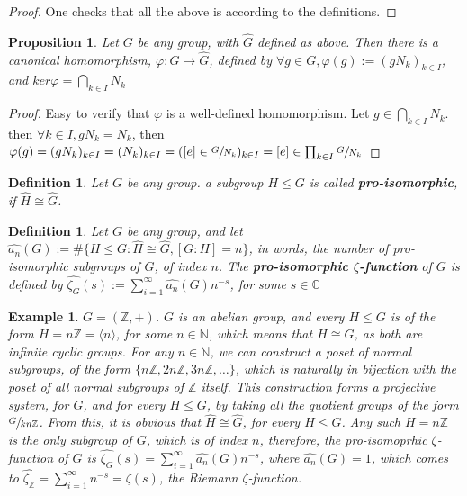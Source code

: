 \documentclass[12pt]{article}
\newtheorem{proposition}[theorem]{Proposition}
\newtheorem{definition}[theorem]{Definition}
\newtheorem{example}[theorem]{Example}
\begin{document}
\begin{proof}
    One checks that all the above is according to the definitions.
\end{proof}
\begin{proposition}
\label{prop:homomorphism.inserve.limit}
Let $G$ be any group, with $\widehat{G}$ defined as above. Then there is a canonical homomorphism, $\varphi:G\rightarrow\widehat{G}$, defined by $\forall g\in G, \varphi(g):=(gN_k)_{k\in I}$, and $ker\varphi=\bigcap_{k\in I}N_k$
\end{proposition}
\begin{proof}
Easy to verify that $\varphi$ is a well-defined homomorphism. Let $g\in\bigcap_{k\in I}N_k$. then $\forall k\in I, gN_k=N_k$, then $\varphi(g)=(gN_k)_{k\in I}=(N_k)_{k\in I}=([e]\in\sfrac{G}{N_k})_{k\in I}=[e]\in\prod_{k\in I}\sfrac{G}{N_k}$
\end{proof}
\begin{definition}
\label{def:pro.isomorphic}
Let $G$ be any group. a subgroup $H\leq G$ is called \textbf{pro-isomorphic}, if $\widehat{H}\cong\widehat{G}$.
\end{definition}
\begin{definition}
\label{def:zeta.pro.isomorphic}
Let $G$ be any group, and let $\widehat{a_n}(G):=\#\{H\leq G : \widehat{H}\cong\widehat{G}, [G:H]=n\}$, in words, the number of pro-isomorphic subgroups of $G$, of index $n$. The \textbf{pro-isomorphic $\zeta$-function} of $G$ is defined by $\widehat{\zeta_G}(s):=\sum_{i=1}^{\infty}\widehat{a_n}(G)n^{-s}$, for some $s\in\mathbb{C}$
\end{definition}
\begin{example}
$G=(\mathbb{Z},+)$. $G$ is an abelian group, and every $H\leq G$ is of the form $H=n\mathbb{Z}=\langle n\rangle$, for some $n\in\mathbb{N}$, which means that $H\cong G$, as both are infinite cyclic groups. For any $n\in\mathbb{N}$, we can construct a poset of normal subgroups, of the form $\{n\mathbb{Z},2n\mathbb{Z},3n\mathbb{Z},\dots\}$, which is naturally in bijection with the poset of all normal subgroups of $\mathbb{Z}$ itself. This construction forms a projective system, for $G$, and for every $H\leq G$, by taking all the quotient groups of the form $\sfrac{G}{kn\mathbb{Z}}$. From this, it is obvious that $\widehat{H}\cong\widehat{G}$, for every $H\leq G$. Any such $H=n\mathbb{Z}$ is the only subgroup of $G$, which is of index $n$, therefore, the pro-isomoprhic $\zeta$-function of $G$ is $\widehat{\zeta_G}(s)=\sum_{i=1}^{\infty}\widehat{a_n}(G)n^{-s}$, where $\widehat{a_n}(G)=1$, which comes to $\widehat{\zeta_{\mathbb{Z}}}=\sum_{i=1}^{\infty}n^{-s}=\zeta(s)$, the Riemann $\zeta$-function. 
\end{example}
\end{document}
